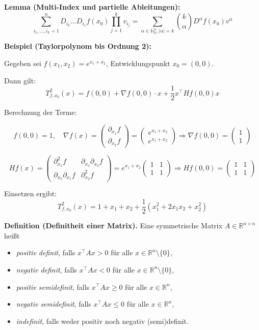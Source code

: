 \textbf{Lemma (Multi-Index und partielle Ableitungen):}
\[
\sum_{i_1, \dots, i_k=1}^n D_{i_k} \dots D_{i_1} f(x_0) \prod_{j=1}^k v_{i_j} 
= \sum_{\alpha \in \mathbb{N}_0^n, |\alpha| = k} \binom{k}{\alpha} D^\alpha f(x_0) v^\alpha
\]

\textbf{Beispiel (Taylorpolynom bis Ordnung 2):}

Gegeben sei \( f(x_1, x_2) = e^{x_1 + x_2} \), Entwicklungspunkt \( x_0 = (0, 0) \).

Dann gilt:
\[
T^2_{f, x_0}(x) 
= f(0, 0) 
+ \nabla f(0,0) \cdot x 
+ \frac{1}{2} x^\top Hf(0,0) x
\]

Berechnung der Terme:

\[
f(0,0) = 1, \quad 
\nabla f(x) = \begin{pmatrix} \partial_{x_1} f \\ \partial_{x_2} f \end{pmatrix} 
= \begin{pmatrix} e^{x_1+x_2} \\ e^{x_1+x_2} \end{pmatrix} 
\Rightarrow \nabla f(0,0) = \begin{pmatrix} 1 \\ 1 \end{pmatrix}
\]

{\small
\[
\textstyle
Hf(x) = \begin{pmatrix}
\partial_{x_1}^2 f & \partial_{x_1}\partial_{x_2} f \\
\partial_{x_2}\partial_{x_1} f & \partial_{x_2}^2 f
\end{pmatrix}
= e^{x_1+x_2} \begin{pmatrix}
1 & 1 \\
1 & 1
\end{pmatrix}
\Rightarrow Hf(0,0) = \begin{pmatrix}
1 & 1 \\
1 & 1
\end{pmatrix}
\]
}

Einsetzen ergibt:
\[
T^2_{f, x_0}(x) 
= 1 + x_1 + x_2 + \frac{1}{2} \left( x_1^2 + 2x_1x_2 + x_2^2 \right)
\]

\textbf{Definition (Definitheit einer Matrix).} Eine symmetrische Matrix \( A \in \mathbb{R}^{n \times n} \) heißt
\begin{itemize}
  \item \textit{positiv definit}, falls \( x^\top A x > 0 \) für alle \( x \in \mathbb{R}^n \setminus \{0\} \),
  \item \textit{negativ definit}, falls \( x^\top A x < 0 \) für alle \( x \in \mathbb{R}^n \setminus \{0\} \),
  \item \textit{positiv semidefinit}, falls \( x^\top A x \geq 0 \) für alle \( x \in \mathbb{R}^n \),
  \item \textit{negativ semidefinit}, falls \( x^\top A x \leq 0 \) für alle \( x \in \mathbb{R}^n \),
  \item \textit{indefinit}, falls weder positiv noch negativ (semi)definit.
\end{itemize}


